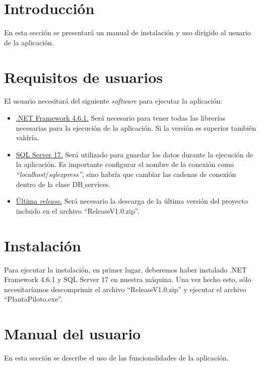
\section{Introducción}

En esta sección se presentará un manual de instalación y uso dirigido al usuario de la aplicación.

\section{Requisitos de usuarios}

El usuario necesitará del siguiente \textit{software} para ejecutar la aplicación:
\begin{itemize}
	\item \href{https://www.microsoft.com/es-es/download/details.aspx?id=49982}{.NET Framework 4.6.1.} Será necesario para tener todas las librerías necesarias para la ejecución de la aplicación. Si la versión es superior también valdría.
	\item \href{https://www.microsoft.com/es-es/sql-server/sql-server-downloads}{SQL Server 17.} Será utilizado para guardar los datos durante la ejecución de la aplicación. Es importante configurar el nombre de la conexión como \textit{``localhost$\slash$sqlexpress''}, sino habría que cambiar las cadenas de conexión dentro de la clase DB$\_$services.
	\item \href{https://github.com/FranBurgos/TFG/releases/tag/V_1.0}{Última \textit{release}.} Será necesario la descarga de la última versión del proyecto incluido en el archivo ``ReleaseV1.0.zip''.
\end{itemize}

\section{Instalación}

Para ejecutar la instalación, en primer lugar, deberemos haber instalado .NET Framework 4.6.1 y SQL Server 17 en nuestra máquina. Una vez hecho esto, sólo necesitaríamos descomprimir el archivo ``ReleaseV1.0.zip'' y ejecutar el archivo ``PlantaPiloto.exe''.

\section{Manual del usuario}

En esta sección se describe el uso de las funcionalidades de la aplicación.

